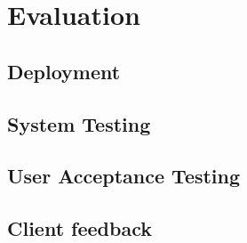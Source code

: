 \chapter{Evaluation}

\section{Deployment}

\section{System Testing}

\section{User Acceptance Testing}

\section{Client feedback}